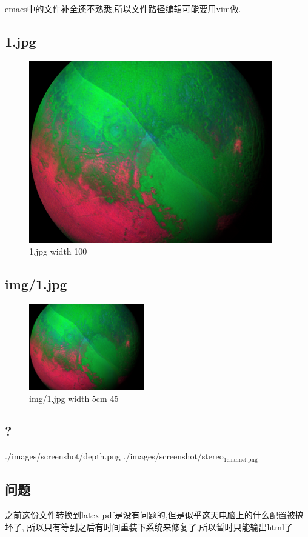 \documentclass[11pt]{article}
\begin{document}
emacs中的文件补全还不熟悉,所以文件路径编辑可能要用vim做.
\subsection{1.jpg}
\label{sec:orgheadline5}
\begin{figure}[htb]
\centering
\includegraphics[width=.9\linewidth]{1.jpg}
\caption{\label{fig:orgparagraph2}
1.jpg width 100}
\end{figure}
\subsection{img/1.jpg}
\label{sec:orgheadline6}
\begin{figure}[htb]
\centering
\includegraphics[angle=45,width=5cm]{img/1.jpg}
\caption{\label{fig:orgparagraph3}
img/1.jpg width 5cm 45}
\end{figure}
\subsection{?}
\label{sec:orgheadline7}
./images/screenshot/depth.png
./images/screenshot/stereo\(_{\text{1channel.png}}\)
\subsection{问题}
\label{sec:orgheadline8}
之前这份文件转换到latex pdf是没有问题的,但是似乎这天电脑上的什么配置被搞坏了,
所以只有等到之后有时间重装下系统来修复了,所以暂时只能输出html了
\end{document}
